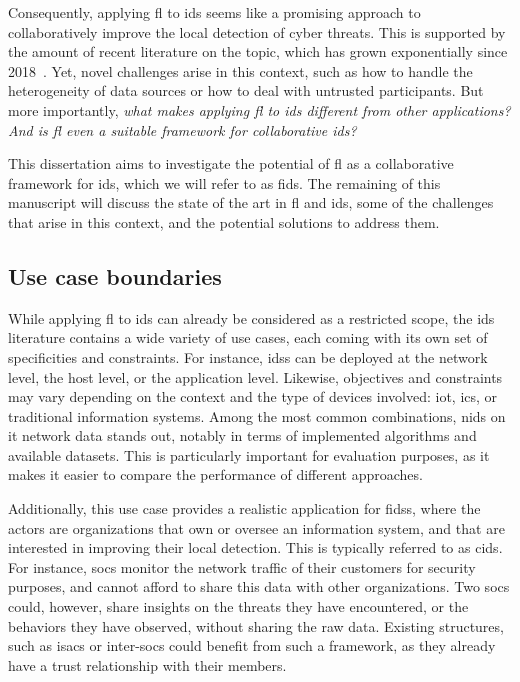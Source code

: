 Consequently, applying \gls{fl} to \gls{ids} seems like a promising approach to collaboratively improve the local detection of cyber threats.
This is supported by the amount of recent literature on the topic, which has grown exponentially since 2018~\cite{lavaur_EvolutionFederatedLearningbased_2022,ismaila_ReviewApproachesFederated_2024}.
Yet, novel challenges arise in this context, such as how to handle the heterogeneity of data sources or how to deal with untrusted participants.
But more importantly, \emph{what makes applying \gls{fl} to \gls{ids} different from other applications? And is \gls{fl} even a suitable framework for collaborative \gls{ids}?}

This dissertation aims to investigate the potential of \acrlong{fl} as a collaborative framework for \acrlong{ids}, which we will refer to as \gls{fids}.
The remaining of this manuscript will discuss the state of the art in \gls{fl} and \gls{ids}, some of the challenges that arise in this context, and the potential solutions to address them.


\subsection{Use case boundaries\label{sec:intro.context.usecase}}

While applying \gls{fl} to \gls{ids} can already be considered as a restricted scope, the \gls{ids} literature contains a wide variety of use cases, each coming with its own set of specificities and constraints.
For instance, \glspl{ids} can be deployed at the network level, the host level, or the application level.
Likewise, objectives and constraints may vary depending on the context and the type of devices involved: \gls{iot}, \gls{ics}, or traditional information systems.
Among the most common combinations, \gls{nids} on \gls{it} network data stands out, notably in terms of implemented algorithms and available datasets.
This is particularly important for evaluation purposes, as it makes it easier to compare the performance of different approaches.

Additionally, this use case provides a realistic application for \glspl{fids}, where the actors are organizations that own or oversee an information system, and that are interested in improving their local detection.
This is typically referred to as \gls{cids}.
For instance, \glspl{soc} monitor the network traffic of their customers for security purposes, and cannot afford to share this data with other organizations.
Two \glspl{soc} could, however, share insights on the threats they have encountered, or the behaviors they have observed, without sharing the raw data.
Existing structures, such as \glspl{isac} or inter-\glspl{soc} could benefit from such a framework, as they already have a trust relationship with their members.


